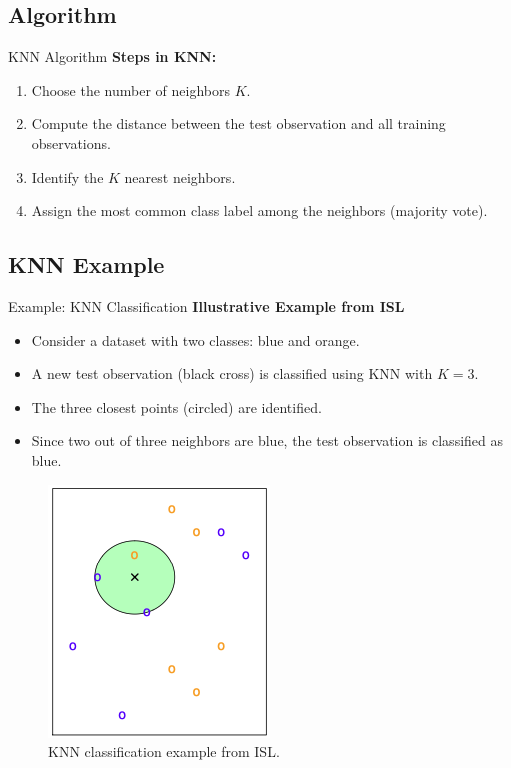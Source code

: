 \documentclass[aspectratio=169,xcolor=dvipsnames]{beamer}
\begin{document}
\subsection{Algorithm}
\begin{frame}{KNN Algorithm}
    \textbf{Steps in KNN:}
    \begin{enumerate}
        \setlength\itemsep{0.33cm}
        \item Choose the number of neighbors \( K \).
        \item Compute the distance between the test observation and all training observations.
        \item Identify the \( K \) nearest neighbors.
        \item Assign the most common class label among the neighbors (majority vote).
    \end{enumerate}
    \begin{figure}
        \centering
    \end{figure}
\end{frame}
\subsection{KNN Example}
\begin{frame}{Example: KNN Classification}
    \textbf{Illustrative Example from ISL}
    \begin{itemize}
        \item Consider a dataset with two classes: blue and orange.
        \item A new test observation (black cross) is classified using KNN with \( K = 3 \).
        \item The three closest points (circled) are identified.
        \item Since two out of three neighbors are blue, the test observation is classified as blue.
    \end{itemize}
    \begin{figure}
        \centering
        \includegraphics[width=0.25\linewidth]{images/circle.png}
        \caption{KNN classification example from ISL.}
    \end{figure}
\end{frame}
\end{document}
